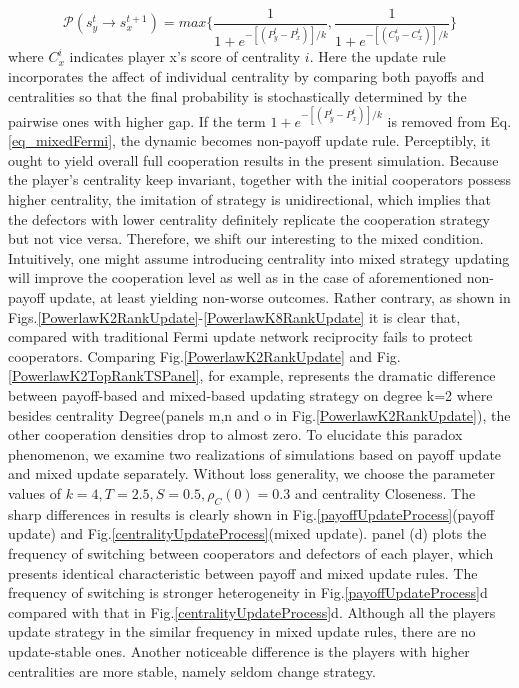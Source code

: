 \documentclass[preprint,12pt,3p]{elsarticle}
\begin{document}
\begin{equation}
\mathcal{P}(s_y^t\rightarrow s_x^{t+1})=max\{ \frac{1}{1+e^{-[(P_y^t-P_x^t)]/k}},\frac{1}{1+e^{-[(C^i_y-C^i_x)]/k} }\}
\label{eq_mixedFermi}
\end{equation}
where $C^i_x$ indicates player x's score of centrality $i$.
Here the update rule incorporates the affect of individual centrality by comparing both payoffs
and centralities so that the final probability is stochastically determined by the pairwise ones with higher gap.
    If the term $1+e^{-[(P_y^t-P_x^t)]/k}$ is removed from Eq.\ref{eq_mixedFermi},
the dynamic becomes non-payoff update rule.
Perceptibly, it ought to yield overall full cooperation results in the present simulation.
Because the player's centrality keep invariant, together with the initial cooperators possess higher centrality, the imitation of strategy is unidirectional, which implies that the defectors with lower
centrality definitely replicate the cooperation strategy but not vice versa.
    Therefore, we shift our interesting to the mixed condition.
Intuitively, one might assume introducing centrality into mixed strategy updating will improve the cooperation level as well as in the case of aforementioned non-payoff update,
at least yielding non-worse outcomes.
Rather contrary, as shown in Figs.\ref{PowerlawK2RankUpdate}-\ref{PowerlawK8RankUpdate} it is clear that, compared with traditional Fermi update network reciprocity fails to protect cooperators.
Comparing Fig.\ref{PowerlawK2RankUpdate} and Fig.\ref{PowerlawK2TopRankTSPanel},
for example, represents the dramatic difference between payoff-based and mixed-based updating strategy
on degree k=2 where besides centrality Degree(panels m,n and o in Fig.\ref{PowerlawK2RankUpdate}),
the other cooperation densities drop to almost zero.
    To elucidate this paradox phenomenon, we examine two realizations of simulations based on
payoff update and mixed update separately.
Without loss generality, we choose the parameter values of $k=4,T=2.5,S=0.5,\rho_{C}(0)=0.3$ and centrality Closeness.
    The sharp differences in results is clearly shown in Fig.\ref{payoffUpdateProcess}(payoff update)
and Fig.\ref{centralityUpdateProcess}(mixed update).
    panel (d) plots the frequency of switching between cooperators and defectors of each player,
which presents identical characteristic between payoff and mixed update rules.
The frequency of switching is stronger heterogeneity in Fig.\ref{payoffUpdateProcess}d compared with that in Fig.\ref{centralityUpdateProcess}d.
Although all the players update strategy in the similar frequency in mixed update rules, there are no
update-stable ones.
    Another noticeable difference is the players with higher centralities are more stable, namely seldom change
strategy.
\end{document}
